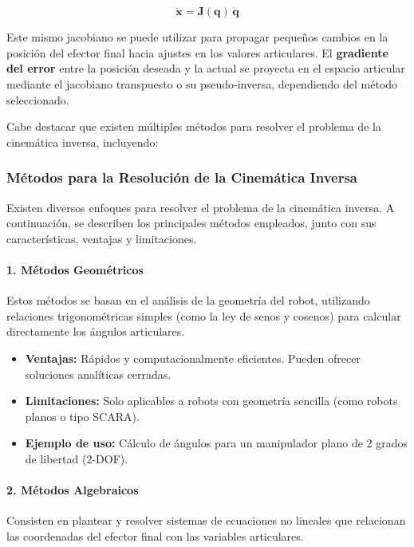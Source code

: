 \[
\dot{\mathbf{x}} = \mathbf{J}(\mathbf{q}) \, \dot{\mathbf{q}}
\]

Este mismo jacobiano se puede utilizar para propagar pequeños cambios en la posición del efector final hacia ajustes en los valores articulares. El \textbf{gradiente del error} entre la posición deseada y la actual se proyecta en el espacio articular mediante el jacobiano transpuesto o su pseudo-inversa, dependiendo del método seleccionado.

Cabe destacar que existen múltiples métodos para resolver el problema de la cinemática inversa, incluyendo:
\subsubsection{Métodos para la Resolución de la Cinemática Inversa}

Existen diversos enfoques para resolver el problema de la cinemática inversa. A continuación, se describen los principales métodos empleados, junto con sus características, ventajas y limitaciones.

\paragraph{1. Métodos Geométricos}

Estos métodos se basan en el análisis de la geometría del robot, utilizando relaciones trigonométricas simples (como la ley de senos y cosenos) para calcular directamente los ángulos articulares.

\begin{itemize}
	\item \textbf{Ventajas:} Rápidos y computacionalmente eficientes. Pueden ofrecer soluciones analíticas cerradas.
	\item \textbf{Limitaciones:} Solo aplicables a robots con geometría sencilla (como robots planos o tipo SCARA).
	\item \textbf{Ejemplo de uso:} Cálculo de ángulos para un manipulador plano de 2 grados de libertad (2-DOF).
\end{itemize}

\paragraph{2. Métodos Algebraicos}

Consisten en plantear y resolver sistemas de ecuaciones no lineales que relacionan las coordenadas del efector final con las variables articulares.

